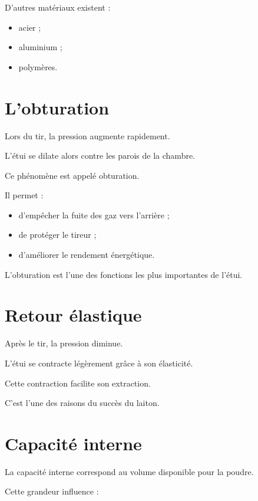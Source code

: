 D'autres matériaux existent :

\begin{itemize}
    \item acier ;
    \item aluminium ;
    \item polymères.
\end{itemize}

\section{L'obturation}

Lors du tir, la pression augmente rapidement.

L'étui se dilate alors contre les parois de la chambre.

Ce phénomène est appelé obturation.

Il permet :

\begin{itemize}
    \item d'empêcher la fuite des gaz vers l'arrière ;
    \item de protéger le tireur ;
    \item d'améliorer le rendement énergétique.
\end{itemize}

\begin{aretenir}

L'obturation est l'une des fonctions les plus importantes de l'étui.

\end{aretenir}

\section{Retour élastique}

Après le tir, la pression diminue.

L'étui se contracte légèrement grâce à son élasticité.

Cette contraction facilite son extraction.

C'est l'une des raisons du succès du laiton.

\section{Capacité interne}

La capacité interne correspond au volume disponible pour la poudre.

Cette grandeur influence :

